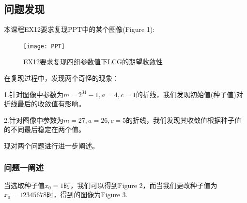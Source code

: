 \documentclass[12pt,a4paper]{article}%
\begin{document}
    \subsection{问题发现}
    本课程EX12要求复现PPT中的某个图像(Figure 1):

    \begin{figure}[htbp]
        \centering
        \texttt{[image: PPT]}
        \caption{EX12要求复现四组参数值下LCG的期望收敛性}\label{fig:figure}
    \end{figure}

    在复现过程中，发现两个奇怪的现象：

    1.针对图像中参数为$m=2^{31}-1,a=4,c=1$的折线，我们发现初始值(种子值)对折线最后的收敛值有影响。

    2.针对图像中参数为$m=27,a=26,c=5$的折线，我们发现其收敛值根据种子值的不同最后稳定在两个值。

    现对两个问题进行进一步阐述。

    \subsubsection{问题一阐述}
    当选取种子值$x_0=1$时，我们可以得到Figure 2，而当我们更改种子值为$x_0=12345678$时，得到的图像为Figure 3.
\end{document}
